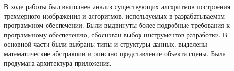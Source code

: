 \Conclusion

В ходе работы был выполнен анализ существующих алгоритмов построения трехмерного изображения и алгоритмов, используемых в разрабатываемом программном обеспечении. Были выдвинуты более подробные требования к программному обеспечению, обоснован выбор инструментов разработки. В основной части были выбраны типы и структуры данных, выделены математические абстракции и описано представление объекта сцены. Была продумана архитектура приложения.
